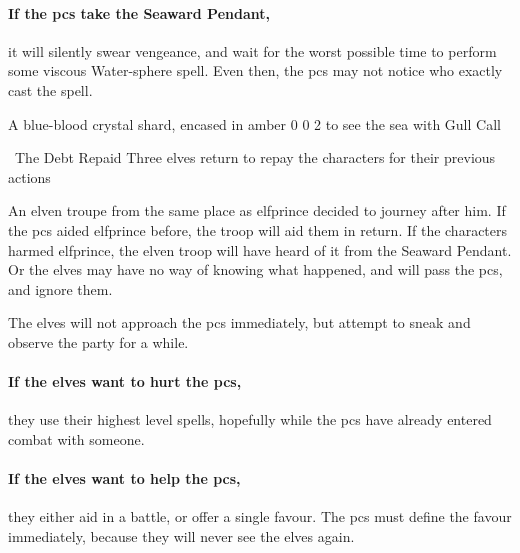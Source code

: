 \paragraph{If the \glspl{pc} take the Seaward Pendant,}
it will silently swear vengeance, and wait for the worst possible time to perform some viscous Water-\gls{sphere} \gls{spell}.
Even then, the \glspl{pc} may not notice who exactly cast the spell.

  {A blue-blood crystal shard, encased in amber}%
  {0}%
  {0}%
  {2}%
  {to see the sea with }%
  {Gull Call}%
  {
    \setcounter{Water}{3}
    \setcounter{Vigilance}{2}
    \setcounter{Performance}{1}
    \setcounter{Survival}{1}
  }%

\showStdSpells

\elfprince

\showStdSpells

{\squash~The Debt Repaid}%
{Three elves return to repay the characters for their previous actions}%
\label{karmaElves}

An elven troupe from the same place as \gls{elfprince} decided to journey after him.
If the \glspl{pc} aided \gls{elfprince} before, the troop will aid them in return.
If the characters harmed \gls{elfprince}, the elven troop will have heard of it from the Seaward Pendant.
Or the elves may have no way of knowing what happened, and will pass the \glspl{pc}, and ignore them.

The elves will not approach the \glspl{pc} immediately, but attempt to sneak and observe the party for a while.

\paragraph{If the elves want to hurt the \glspl{pc},}
they use their highest level spells, hopefully while the \glspl{pc} have already entered combat with someone.

\paragraph{If the elves want to help the \glspl{pc},}
they either aid in a battle, or offer a single favour.
The \glspl{pc} must define the favour immediately, because they will never see the elves again.


